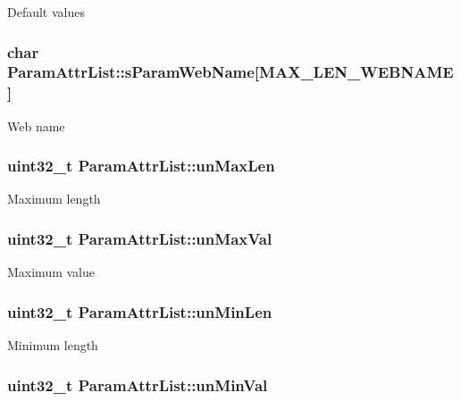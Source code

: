 Default values \hypertarget{structParamAttrList_a279353c868f69304db1ab9e0620dd08a}{
\subsubsection[{s\-Param\-Web\-Name}]{\setlength{\rightskip}{0pt plus 5cm}char Param\-Attr\-List\-::s\-Param\-Web\-Name\mbox{[}{\bf M\-A\-X\-\_\-\-L\-E\-N\-\_\-\-W\-E\-B\-N\-A\-M\-E}\mbox{]}}}\label{structParamAttrList_a279353c868f69304db1ab9e0620dd08a}
Web name \hypertarget{structParamAttrList_a47232c322bb7aa44bc8281de097b0126}{
\subsubsection[{un\-Max\-Len}]{\setlength{\rightskip}{0pt plus 5cm}uint32\-\_\-t Param\-Attr\-List\-::un\-Max\-Len}}\label{structParamAttrList_a47232c322bb7aa44bc8281de097b0126}
Maximum length \hypertarget{structParamAttrList_a990542ae05c218ca1bcbb2b12bd1880d}{
\subsubsection[{un\-Max\-Val}]{\setlength{\rightskip}{0pt plus 5cm}uint32\-\_\-t Param\-Attr\-List\-::un\-Max\-Val}}\label{structParamAttrList_a990542ae05c218ca1bcbb2b12bd1880d}
Maximum value \hypertarget{structParamAttrList_adb113fb2072819c1cbccf7316f05bc0c}{
\subsubsection[{un\-Min\-Len}]{\setlength{\rightskip}{0pt plus 5cm}uint32\-\_\-t Param\-Attr\-List\-::un\-Min\-Len}}\label{structParamAttrList_adb113fb2072819c1cbccf7316f05bc0c}
Minimum length \hypertarget{structParamAttrList_ae51e6c2f62b765283184b01d5cabc4d8}{
\subsubsection[{un\-Min\-Val}]{\setlength{\rightskip}{0pt plus 5cm}uint32\-\_\-t Param\-Attr\-List\-::un\-Min\-Val}}\label{structParamAttrList_ae51e6c2f62b765283184b01d5cabc4d8}
